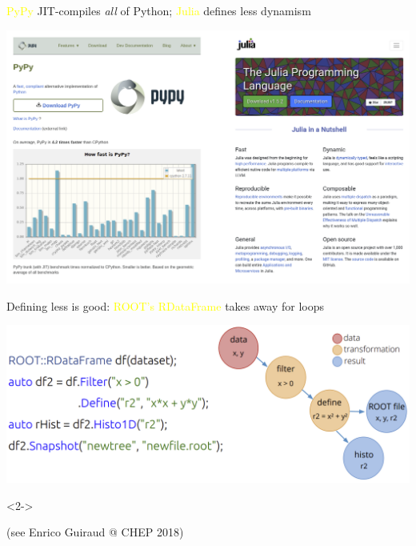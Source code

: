 \documentclass[aspectratio=169]{beamer}
\begin{document}
\begin{frame}{\textcolor{yellow}{PyPy} JIT-compiles {\it all} of Python; \textcolor{yellow}{Julia} defines less dynamism}
\vspace{0.05 cm}
\begin{center}
\includegraphics[width=0.91\linewidth]{img/pypy-and-julia.png}
\end{center}
\end{frame}

\begin{frame}{Defining less is good: \textcolor{yellow}{ROOT's RDataFrame} takes away for loops}
\vspace{0.25 cm}

\begin{center}
\includegraphics[width=\linewidth]{img/rdataframe-graph.png}
\end{center}

\begin{uncoverenv}<2->
\end{uncoverenv}

\vspace{0.25 cm}
(see Enrico Guiraud @ CHEP 2018)
\end{frame}
\end{document}

